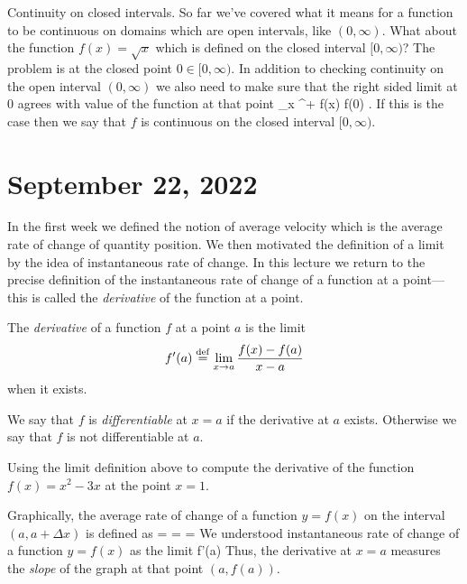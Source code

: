 \documentclass[11pt]{amsart}
\begin{document}
\parsec 
Continuity on closed intervals. 
So far we've covered what it means for a function to be continuous on domains which are open intervals, like $(0,\infty)$. 
What about the function $f(x) = \sqrt{x}$ which is defined on the closed interval $[0,\infty)$? 
The problem is at the closed point $0 \in [0,\infty)$. 
In addition to checking continuity on the open interval $(0,\infty)$ we also need to make sure that the right sided limit at $0$ agrees with value of the function at that point
\beqn
\lim_{x ^+} f(x)  f(0) .
\eeqn
If this is the case then we say that $f$ is continuous on the closed interval $[0,\infty)$. 

\newpage

\section*{September 22, 2022}

In the first week we defined the notion of average velocity which is the average rate of change of quantity position. 
We then motivated the definition of a limit by the idea of instantaneous rate of change.
In this lecture we return to the precise definition of the instantaneous rate of change of a function at a point---this is called the {\em derivative} of the function at a point. 

\begin{dfn}
The {\em derivative} of a function $f$ at a point $a$ is the limit
\[
f'(a) \overset{\rm def}{=} \lim_{x\to a} \frac{f(x) - f(a)}{x-a}
\]
when it exists. 
\end{dfn}

We say that $f$ is {\em differentiable} at $x=a$ if the derivative at $a$ exists. 
Otherwise we say that $f$ is not differentiable at $a$. 

\begin{eg} 
Using the limit definition above to compute the derivative of the function $f(x) = x^2 - 3x$ at the point $x = 1$. 
\end{eg}


\newpage


Graphically, the average rate of change of a function $y=f(x)$ on the interval $(a,a+\Delta x)$ is defined as 
\beqn
{} =  =  =  
\eeqn 
We understood instantaneous rate of change of a function $y=f(x)$ as the limit 
\beqn
{}  f'(a)
\eeqn
Thus, the derivative at $x = a$ measures the {\em slope} of the graph at that point $(a, f(a))$.
\end{document}
